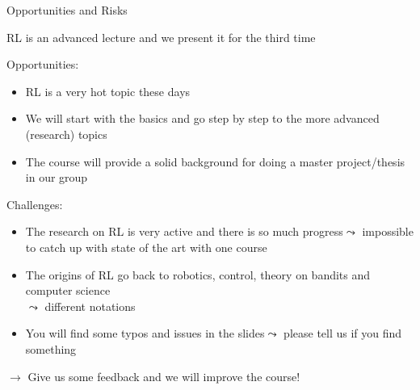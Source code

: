 \documentclass[aspectratio=169]{../latex_main/tntbeamer}  %
\begin{document}
\begin{frame}[c]{Opportunities and Risks}
	
	\vspace{-1em}
	RL is an advanced lecture and we present it for the third time
	
	\medskip
	\pause
	
	Opportunities:
	\begin{itemize}
		\item RL is a very hot topic these days
		\item We will start with the basics and go step by step to the more advanced (research) topics
		\item The course will provide a solid background for doing a master project/thesis in our group 
	\end{itemize}
	
	\pause
	
	Challenges:
	\begin{itemize}
		\item The research on RL is very active and there is so much progress\newline $\leadsto$ impossible to catch up with state of the art with one course
		\item The origins of RL go back to robotics, control, theory on bandits and computer science\\ $\leadsto$ different notations
		\item You will find some typos and issues in the slides\newline $\leadsto$ please tell us if you find something
	\end{itemize}
	
	\pause
	$\to$ Give us some feedback and we will improve the course!
	
	
\end{frame}
\end{document}
